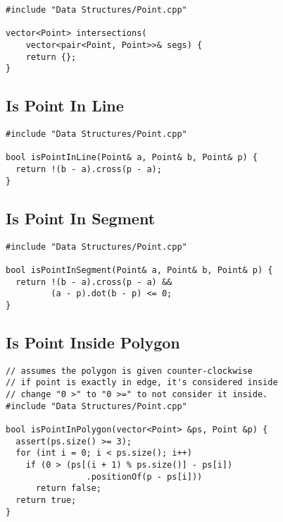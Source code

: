 \documentclass[twoside]{article}
\newcommand{\fileTitleStyle}{\large\underline}
\begin{document}
\begin{multicols*}{2}
\begin{verbatim}
#include "Data Structures/Point.cpp"

vector<Point> intersections(
    vector<pair<Point, Point>>& segs) {
    return {};
}
\end{verbatim}

\subsectionfont{\centering\bfseries\LARGE}
\subsectionfont{\fileTitleStyle}
\subsection*{Is Point In Line}
\begin{verbatim}
#include "Data Structures/Point.cpp"

bool isPointInLine(Point& a, Point& b, Point& p) {
  return !(b - a).cross(p - a);
}
\end{verbatim}

\subsectionfont{\centering\bfseries\LARGE}
\subsectionfont{\fileTitleStyle}
\subsection*{Is Point In Segment}
\begin{verbatim}
#include "Data Structures/Point.cpp"

bool isPointInSegment(Point& a, Point& b, Point& p) {
  return !(b - a).cross(p - a) &&
         (a - p).dot(b - p) <= 0;
}
\end{verbatim}

\subsectionfont{\centering\bfseries\LARGE}
\subsectionfont{\fileTitleStyle}
\subsection*{Is Point Inside Polygon}
\begin{verbatim}
// assumes the polygon is given counter-clockwise
// if point is exactly in edge, it's considered inside
// change "0 >" to "0 >=" to not consider it inside.
#include "Data Structures/Point.cpp"

bool isPointInPolygon(vector<Point> &ps, Point &p) {
  assert(ps.size() >= 3);
  for (int i = 0; i < ps.size(); i++)
    if (0 > (ps[(i + 1) % ps.size()] - ps[i])
                .positionOf(p - ps[i]))
      return false;
  return true;
}
\end{verbatim}


\end{multicols*}
\end{document}
